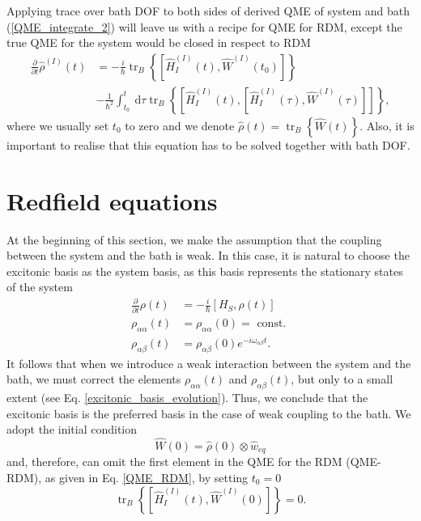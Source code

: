 Applying trace over bath DOF to both sides of derived QME of system and bath (\ref{QME_integrate_2}) will leave us with a recipe for QME for RDM, except the true QME for the system would be closed in respect to RDM
\begin{equation}
\label{QME_RDM}
\begin{aligned}
    \frac{\partial}{\partial t}\hat{\rho}^{(I)}(t) &= -\frac{i}{\hbar} \operatorname{tr}_B \left\{[ \hat{H}_I^{(I)}(t), \hat{W}^{(I)}(t_0) ]\right\} \\
    &-\frac{1}{\hbar^2} \int_{t_0}^{t} \mathrm{~d} \tau \operatorname{tr}_B \left\{[ \hat{H}_I^{(I)}(t), [ \hat{H}_I^{(I)}(\tau), \hat{W}^{(I)}(\tau) ] ] \right\},
    \end{aligned}
\end{equation}
where we usually set $t_0$ to zero and we denote $\hat{\rho}(t) = \operatorname{tr}_B \left\{\hat{W}(t)\right\}$. Also, it is important to realise that this equation has to be solved together with bath DOF.

\section{Redfield equations}
\label{Redfield equations}
At the beginning of this section, we make the assumption that the coupling between the system and the bath is weak. In this case, it is natural to choose the excitonic basis as the system basis, as this basis represents the stationary states of the system
\begin{equation}
\label{excitonic_basis_evolution}
    \begin{aligned}
    \frac{\partial}{\partial t} \rho(t) &=-\frac{i}{\hbar}\left[H_{S}, \rho(t)\right] \\
    \rho_{\alpha \alpha}(t) &=\rho_{\alpha \alpha}(0)=\text { const. } \\
    \rho_{\alpha \beta}(t) &= \rho_{\alpha \beta}(0) e^{-i \omega_{\alpha \beta} t}.
    \end{aligned}
\end{equation}
It follows that when we introduce a weak interaction between the system and the bath, we must correct the elements $\rho_{\alpha \alpha}(t)$ and $\rho_{\alpha \beta}(t)$, but only to a small extent (see Eq. \ref{excitonic_basis_evolution}). Thus, we conclude that the excitonic basis is the preferred basis in the case of weak coupling to the bath. We adopt the initial condition
\begin{equation}
    \hat{W}(0) = \hat{\rho}(0) \otimes \hat{w}_{eq}
\end{equation}
and, therefore, can omit the first element in the QME for the RDM (QME-RDM), as given in Eq. \ref{QME_RDM}, by setting $t_0 = 0$
\begin{equation}
    \operatorname{tr}_B \left\{[ \hat{H}_I^{(I)}(t), \hat{W}^{(I)}(0) ]\right\} = 0.
\end{equation}

